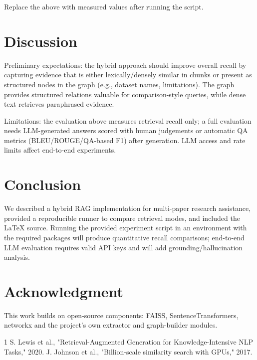 \documentclass[conference]{IEEEtran}
\begin{document}
Replace the above with measured values after running the script.

\section{Discussion}
Preliminary expectations: the hybrid approach should improve overall
recall by capturing evidence that is either lexically/densely similar
in chunks or present as structured nodes in the graph (e.g., dataset
names, limitations). The graph provides structured relations valuable
for comparison-style queries, while dense text retrieves paraphrased
evidence.

Limitations: the evaluation above measures retrieval recall only; a
full evaluation needs LLM-generated answers scored with human
judgements or automatic QA metrics (BLEU/ROUGE/QA-based F1) after
generation. LLM access and rate limits affect end-to-end experiments.

\section{Conclusion}
We described a hybrid RAG implementation for multi-paper research
assistance, provided a reproducible runner to compare retrieval modes,
and included the LaTeX source. Running the provided experiment script
in an environment with the required packages will produce quantitative
recall comparisons; end-to-end LLM evaluation requires valid API keys
and will add grounding/hallucination analysis.

\section*{Acknowledgment}
This work builds on open-source components: FAISS, SentenceTransformers,
networkx and the project's own extractor and graph-builder modules.

\begin{thebibliography}{1}
S. Lewis et al., "Retrieval-Augmented Generation for Knowledge-Intensive NLP Tasks," 2020.
J. Johnson et al., "Billion-scale similarity search with GPUs," 2017.
\end{thebibliography}
\end{document}
